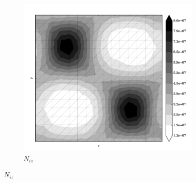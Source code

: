 \begin{figure}
  \begin{subfigure}[b]{0.3\linewidth}
    \includegraphics[width=\linewidth]{images/stress_balance/RS/N_iz.pdf}
  \caption{$N_{iz}$}
  \label{rs_N_iz}
  \end{subfigure}


\end{figure}
